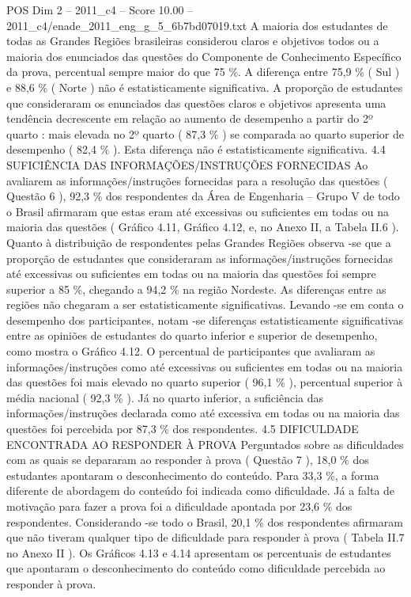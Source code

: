 \begin{textsample}{POS Dim 2 – 2011\_c4 – Score 10.00 – 2011\_c4/enade\_2011\_eng\_g\_5\_6b7bd07019.txt}
A maioria dos estudantes de todas as Grandes Regiões brasileiras considerou claros e objetivos todos ou a maioria dos enunciados das questões do Componente de Conhecimento Específico da prova, percentual sempre maior do que 75 \%.
A diferença entre 75,9 \% ( Sul ) e 88,6 \% ( Norte ) não é estatisticamente significativa.
A proporção de estudantes que consideraram os enunciados das questões claros e objetivos apresenta uma tendência decrescente em relação ao aumento de desempenho a partir do 2º quarto : mais elevada no 2º quarto ( 87,3 \% ) se comparada ao quarto superior de desempenho ( 82,4 \% ).
Esta diferença não é estatisticamente significativa. 4.4 SUFICIÊNCIA DAS INFORMAÇÕES/INSTRUÇÕES FORNECIDAS Ao avaliarem as informações/instruções fornecidas para a resolução das questões ( Questão 6 ), 92,3 \% dos respondentes da Área de Engenharia – Grupo V de todo o Brasil afirmaram que estas eram até excessivas ou suficientes em todas ou na maioria das questões ( Gráfico 4.11, Gráfico 4.12, e, no Anexo II, a Tabela II.6 ).
Quanto à distribuição de respondentes pelas Grandes Regiões observa -se que a proporção de estudantes que consideraram as informações/instruções fornecidas até excessivas ou suficientes em todas ou na maioria das questões foi sempre superior a 85 \%, chegando a 94,2 \% na região Nordeste.
As diferenças entre as regiões não chegaram a ser estatisticamente significativas.
Levando -se em conta o desempenho dos participantes, notam -se diferenças estatisticamente significativas entre as opiniões de estudantes do quarto inferior e superior de desempenho, como mostra o Gráfico 4.12.
O percentual de participantes que avaliaram as informações/instruções como até excessivas ou suficientes em todas ou na maioria das questões foi mais elevado no quarto superior ( 96,1 \% ), percentual superior à média nacional ( 92,3 \% ).
Já no quarto inferior, a suficiência das informações/instruções declarada como até excessiva em todas ou na maioria das questões foi percebida por 87,3 \% dos respondentes. 4.5 DIFICULDADE ENCONTRADA AO RESPONDER À PROVA Perguntados sobre as dificuldades com as quais se depararam ao responder à prova ( Questão 7 ), 18,0 \% dos estudantes apontaram o desconhecimento do conteúdo.
Para 33,3 \%, a forma diferente de abordagem do conteúdo foi indicada como dificuldade.
Já a falta de motivação para fazer a prova foi a dificuldade apontada por 23,6 \% dos respondentes.
Considerando -se todo o Brasil, 20,1 \% dos respondentes afirmaram que não tiveram qualquer tipo de dificuldade para responder à prova ( Tabela II.7 no Anexo II ).
Os Gráficos 4.13 e 4.14 apresentam os percentuais de estudantes que apontaram o desconhecimento do conteúdo como dificuldade percebida ao responder à prova.

\end{textsample}
